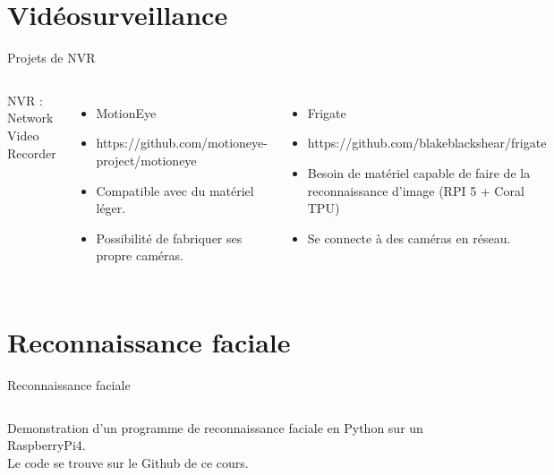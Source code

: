 \documentclass[aspectratio=169,xcolor=dvipsnames]{beamer}
\begin{document}
\section{Vidéosurveillance}

\begin{frame}{Projets de NVR}
    \begin{columns}[c] %

        NVR : Network Video Recorder

        \begin{itemize}
            \item MotionEye
            \item https://github.com/motioneye-project/motioneye
            \item Compatible avec du matériel léger.
            \item Possibilité de fabriquer ses propre caméras.
        \end{itemize}
        \vspace{10pt}
        \begin{itemize}
            \item Frigate
            \item https://github.com/blakeblackshear/frigate
            \item Besoin de matériel capable de faire de la reconnaissance d'image (RPI 5 + Coral TPU)
            \item Se connecte à des caméras en réseau.
        \end{itemize}

    \end{columns}
\end{frame}

\section{Reconnaissance faciale}

\begin{frame}{Reconnaissance faciale}
    \begin{columns}[c] %

        Demonstration d'un programme de reconnaissance faciale en Python sur un RaspberryPi4. \\
        Le code se trouve sur le Github de ce cours.

    \end{columns}
\end{frame}
\end{document}
